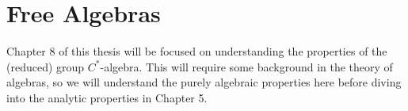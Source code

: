 \section{Free Algebras}%
Chapter 8 of this thesis will be focused on understanding the properties of the (reduced) group $C^{\ast}$-algebra. This will require some background in the theory of algebras, so we will understand the purely algebraic properties here before diving into the analytic properties in Chapter 5.
%
